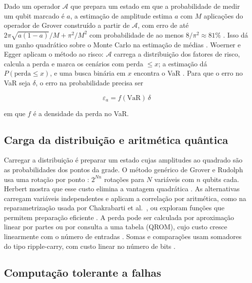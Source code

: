 \documentclass[conference,a4paper]{IEEEtran}
\begin{document}
Dado um operador \(\mathcal{A}\) que prepara um estado em que a probabilidade de medir um qubit marcado é \(a\), a estimação de amplitude estima \(a\) com \(M\) aplicações do operador de Grover construído a partir de \(\mathcal{A}\), com erro de até \(2\pi\sqrt{a(1-a)}/M + \pi^2/M^2\) com probabilidade de ao menos \(8/\pi^2 \approx 81\%\) \cite{brassard2002qae}. Isso dá um ganho quadrático sobre o Monte Carlo na estimação de médias \cite{montanaro2015montecarlo}. Woerner e Egger aplicam o método ao risco: \(\mathcal{A}\) carrega a distribuição dos fatores de risco, calcula a perda e marca os cenários com perda \(\le x\); a estimação dá \(P(\text{perda} \le x)\), e uma busca binária em \(x\) encontra o VaR \cite{woerner2019risk}. Para que o erro no VaR seja \(\delta\), o erro na probabilidade precisa ser

\[\varepsilon_a = f(\mathrm{VaR})\,\delta \tag{2}\]

em que \(f\) é a densidade da perda no VaR.

\subsection{Carga da distribuição e aritmética quântica}\label{carga-da-distribuiuxe7uxe3o-e-aritmuxe9tica-quuxe2ntica}

Carregar a distribuição é preparar um estado cujas amplitudes ao quadrado são as probabilidades dos pontos da grade. O método genérico de Grover e Rudolph usa uma rotação por ponto \cite{grover2002superpositions}: \(2^{Nn}\) rotações para \(N\) variáveis com \(n\) qubits cada. Herbert mostra que esse custo elimina a vantagem quadrática \cite{herbert2021groverrudolph}. As alternativas carregam variáveis independentes e aplicam a correlação por aritmética, como na reparametrização usada por Chakrabarti et al.~\cite{chakrabarti2021threshold}, ou exploram funções que permitem preparação eficiente \cite{carreravazquez2021stateprep}. A perda pode ser calculada por aproximação linear por partes \cite{woerner2019risk} ou por consulta a uma tabela (QROM), cujo custo cresce linearmente com o número de entradas \cite{babbush2018qrom}. Somas e comparações usam somadores do tipo ripple-carry, com custo linear no número de bits \cite{cuccaro2004adder}.

\subsection{Computação tolerante a falhas}\label{computauxe7uxe3o-tolerante-a-falhas}
\end{document}
